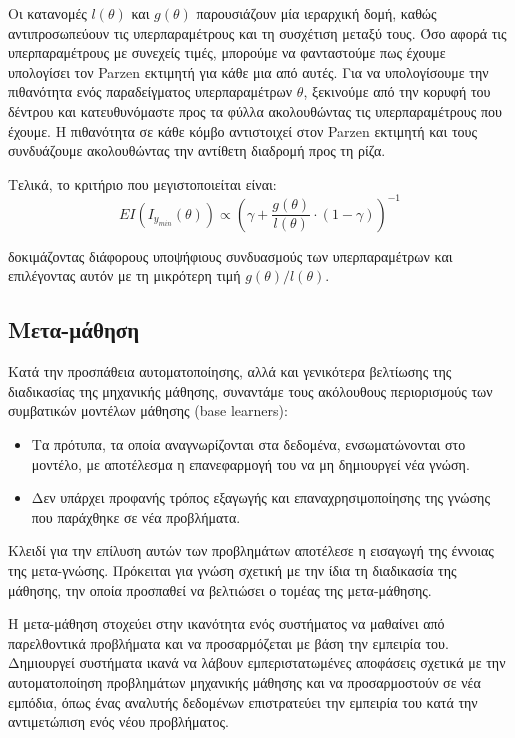  Οι κατανομές $l(\theta)$ και $g(\theta)$ παρουσιάζουν μία ιεραρχική δομή, καθώς αντιπροσωπεύουν τις υπερπαραμέτρους και τη συσχέτιση μεταξύ τους. Όσο αφορά τις υπερπαραμέτρους με συνεχείς τιμές, μπορούμε να φανταστούμε πως έχουμε  υπολογίσει τον Parzen εκτιμητή για κάθε μια από αυτές. Για να υπολογίσουμε την πιθανότητα ενός παραδείγματος υπερπαραμέτρων $\theta$, ξεκινούμε από την κορυφή του δέντρου και κατευθυνόμαστε προς τα φύλλα ακολουθώντας τις υπερπαραμέτρους που έχουμε. Η πιθανότητα σε κάθε κόμβο αντιστοιχεί στον Parzen εκτιμητή και τους συνδυάζουμε ακολουθώντας την αντίθετη διαδρομή προς τη ρίζα.
 
 Τελικά, το κριτήριο που μεγιστοποιείται είναι:
 $$EI(I_{y_{min}}(\theta)) \propto (\gamma + \frac{g(\theta)}{l(\theta)} \cdot (1- \gamma))^{-1}  $$
 
 δοκιμάζοντας διάφορους υποψήφιους συνδυασμούς των υπερπαραμέτρων και επιλέγοντας αυτόν με τη μικρότερη τιμή $g(\theta)/l(\theta)$.
 
 \subsection{Μετα-μάθηση}
 Κατά την προσπάθεια αυτοματοποίησης, αλλά και γενικότερα βελτίωσης της διαδικασίας της μηχανικής μάθησης, συναντάμε τους ακόλουθους περιορισμούς των συμβατικών μοντέλων μάθησης (base learners):
 
 \begin{itemize}
 	\item Τα πρότυπα, τα οποία αναγνωρίζονται στα δεδομένα, ενσωματώνονται στο μοντέλο, με αποτέλεσμα η επανεφαρμογή του να μη δημιουργεί νέα γνώση.
 	\item Δεν υπάρχει προφανής  τρόπος εξαγωγής και επαναχρησιμοποίησης της γνώσης που παράχθηκε σε νέα προβλήματα. 	
 \end{itemize}
 
 Κλειδί για την επίλυση αυτών των προβλημάτων αποτέλεσε η εισαγωγή της έννοιας της μετα-γνώσης. Πρόκειται για γνώση σχετική με την ίδια τη διαδικασία της μάθησης, την οποία προσπαθεί να βελτιώσει ο τομέας της μετα-μάθησης.
 
 Η μετα-μάθηση στοχεύει στην ικανότητα ενός συστήματος να μαθαίνει από παρελθοντικά προβλήματα και να προσαρμόζεται με βάση την εμπειρία του. Δημιουργεί συστήματα ικανά να λάβουν εμπεριστατωμένες αποφάσεις σχετικά με την αυτοματοποίηση προβλημάτων μηχανικής μάθησης και να προσαρμοστούν σε νέα εμπόδια, όπως ένας αναλυτής δεδομένων επιστρατεύει την εμπειρία του κατά την αντιμετώπιση ενός νέου προβλήματος. 
 
